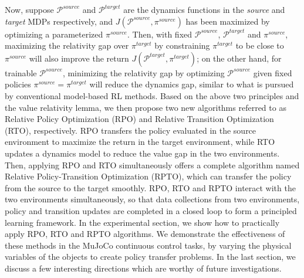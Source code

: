 \documentclass[letterpaper]{article} %
\def\P{{\mathcal{P}}}
\begin{document}
Now, suppose $\P^{source}$ and $\P^{target}$ are the dynamics functions in the \emph{source} and \emph{target} MDPs respectively, and $J(\P^{source},\pi^{source})$ has been maximized by optimizing a parameterized $\pi^{source}$.
Then, with fixed $\P^{source}$, $\P^{target}$ and $\pi^{source}$, maximizing the relativity gap over $\pi^{target}$ by constraining $\pi^{target}$ to be close to $\pi^{source}$ will also improve the return $J(\P^{target},\pi^{target})$; on the other hand, for trainable $\P^{source}$, minimizing the relativity gap by optimizing $\P^{source}$ given fixed policies $\pi^{source}=\pi^{target}$ will reduce the dynamics gap, similar to what is pursued by conventional model-based RL methods.
Based on the above two principles and the value relativity lemma, we then propose two new algorithms referred to as Relative Policy Optimization (RPO) and Relative Transition Optimization (RTO), respectively. RPO transfers the policy evaluated in the source environment to maximize the return in the target environment, while RTO updates a dynamics model to reduce the value gap in the two environments. Then, applying RPO and RTO simultaneously offers a complete algorithm named Relative Policy-Transition Optimization (RPTO), which can transfer the policy from the source to the target smoothly. RPO, RTO and RPTO interact with the two environments simultaneously, so that data collections from two environments, policy and transition updates are completed in a closed loop to form a principled learning framework.
In the experimental section, we show how to practically apply RPO, RTO and RPTO algorithms. We demonstrate the effectiveness of these methods in the MuJoCo continuous control tasks, by varying the physical variables of the objects to create policy transfer problems. In the last section, we discuss a few interesting directions which are worthy of future investigations.
\end{document}

